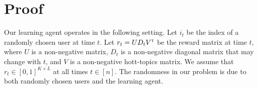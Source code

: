 
\clearpage
\onecolumn
\appendix

\section{Proof}
\label{sec:proof}

Our learning agent operates in the following setting. Let $i_t$ be the index of a randomly chosen user at time $t$. Let $r_t = U D_t V^\mathsf{\scriptscriptstyle T}$ be the reward matrix at time $t$, where $U$ is a non-negative matrix, $D_t$ is a non-negative diagonal matrix that may change with $t$, and $V$ is a non-negative hott-topics matrix. We assume that $r_t \in [0, 1]^{K \times L}$ at all times $t \in [n]$. The randomness in our problem is due to both randomly chosen users and the learning agent.

